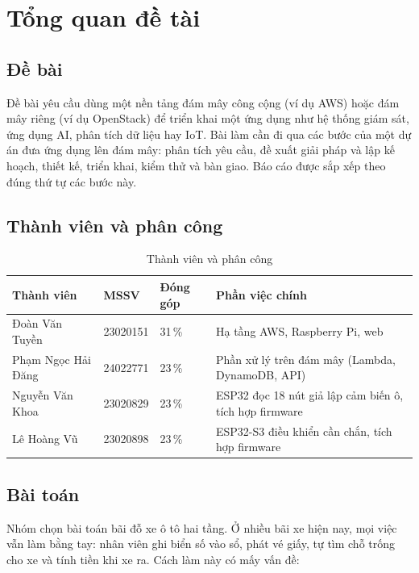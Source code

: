 \chapter{Tổng quan đề tài}

\section{Đề bài}

Đề bài yêu cầu dùng một nền tảng đám mây công cộng (ví dụ AWS) hoặc đám mây riêng (ví dụ OpenStack) để triển khai một ứng dụng như hệ thống giám sát, ứng dụng AI, phân tích dữ liệu hay IoT. Bài làm cần đi qua các bước của một dự án đưa ứng dụng lên đám mây: phân tích yêu cầu, đề xuất giải pháp và lập kế hoạch, thiết kế, triển khai, kiểm thử và bàn giao. Báo cáo được sắp xếp theo đúng thứ tự các bước này.

\section{Thành viên và phân công}

\begin{table}[H]
\centering
\caption{Thành viên và phân công}
\label{tab:doinhom}
\begin{tabularx}{\textwidth}{@{}P{4.2cm}P{2.2cm}P{2cm}L@{}}
\toprule
\textbf{Thành viên} & \textbf{MSSV} & \textbf{Đóng góp} & \textbf{Phần việc chính} \\ \midrule
Đoàn Văn Tuyền & 23020151 & 31\,\% & Hạ tầng AWS, Raspberry Pi, web \\
Phạm Ngọc Hải Đăng & 24022771 & 23\,\% & Phần xử lý trên đám mây (Lambda, DynamoDB, API) \\
Nguyễn Văn Khoa & 23020829 & 23\,\% & ESP32 đọc 18 nút giả lập cảm biến ô, tích hợp firmware \\
Lê Hoàng Vũ & 23020898 & 23\,\% & ESP32-S3 điều khiển cần chắn, tích hợp firmware \\
\bottomrule
\end{tabularx}
\end{table}

\section{Bài toán}

Nhóm chọn bài toán bãi đỗ xe ô tô hai tầng. Ở nhiều bãi xe hiện nay, mọi việc vẫn làm bằng tay: nhân viên ghi biển số vào sổ, phát vé giấy, tự tìm chỗ trống cho xe và tính tiền khi xe ra. Cách làm này có mấy vấn đề:


